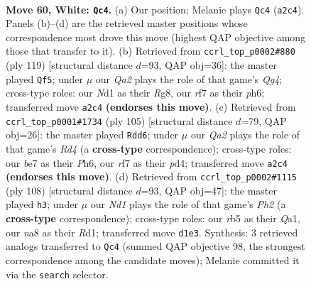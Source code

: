 \documentclass[11pt]{article}
\begin{document}
\clearpage

\begin{figure}[p]\centering
\begin{subfigure}{0.46\textwidth}\centering
\resizebox{\linewidth}{!}{%
\newchessgame
\chessboard[
  setfen={n7/3qbrk1/8/Prp2p1p/3p1Pp1/8/QRRBP2P/3N2K1 w - - 2 60},
  showmover=false,
  pgfstyle=straightmove, color=movearrow, markmove={a2-c4}
]}
\caption{}
\end{subfigure}\hfill
\begin{subfigure}{0.46\textwidth}\centering
\resizebox{\linewidth}{!}{%
\newchessgame
\chessboard[
  setfen={6rk/2p2r2/1p1p3P/3Pn1q1/2P2p2/P1R2B2/KP5Q/5R2 b - - 8 60},
  showmover=false,
  pgfstyle=straightmove, color=movearrow, markmove={g5-f5}
]}
\caption{}
\end{subfigure}
\\[4pt]
\begin{subfigure}{0.46\textwidth}\centering
\resizebox{\linewidth}{!}{%
\newchessgame
\chessboard[
  setfen={6k1/3q2p1/2r1pp1p/3r4/p2P4/PbB1RP1P/1P4P1/2R2Q1K b - - 15 53},
  showmover=false,
  pgfstyle=straightmove, color=movearrow, markmove={d5-d6}
]}
\caption{}
\end{subfigure}\hfill
\begin{subfigure}{0.46\textwidth}\centering
\resizebox{\linewidth}{!}{%
\newchessgame
\chessboard[
  setfen={1r3q1k/7b/p3rn1p/P1pN1p2/5P2/4p3/4B2P/Q2R2RK w - - 2 55},
  showmover=false,
  pgfstyle=straightmove, color=movearrow, markmove={h2-h3}
]}
\caption{}
\end{subfigure}
\caption{\textbf{Move 60, White: \texttt{Qc4}.} (a) Our position; Melanie plays \texttt{Qc4} (\texttt{a2c4}). Panels (b)--(d) are the retrieved master positions whose correspondence most drove this move (highest QAP objective among those that transfer to it). (b) Retrieved from \texttt{ccrl\_top\_p0002\#880} (ply 119) [structural distance $d$=93, QAP obj=36]: the master played \texttt{Qf5}; under $\mu$ our \emph{Qa2} plays the role of that game's \emph{Qg4}; cross-type roles: our \emph{N}d1 as their \emph{R}g8, our \emph{r}f7 as their \emph{p}h6; transferred move \texttt{a2c4} \textbf{(endorses this move)}. (c) Retrieved from \texttt{ccrl\_top\_p0001\#1734} (ply 105) [structural distance $d$=79, QAP obj=26]: the master played \texttt{Rdd6}; under $\mu$ our \emph{Qa2} plays the role of that game's \emph{Rd4} (a \textbf{cross-type} correspondence); cross-type roles: our \emph{b}e7 as their \emph{P}h6, our \emph{r}f7 as their \emph{p}d4; transferred move \texttt{a2c4} \textbf{(endorses this move)}. (d) Retrieved from \texttt{ccrl\_top\_p0002\#1115} (ply 108) [structural distance $d$=93, QAP obj=47]: the master played \texttt{h3}; under $\mu$ our \emph{Nd1} plays the role of that game's \emph{Ph2} (a \textbf{cross-type} correspondence); cross-type roles: our \emph{r}b5 as their \emph{Q}a1, our \emph{n}a8 as their \emph{R}d1; transferred move \texttt{d1e3}. Synthesis: 3 retrieved analogs transferred to \texttt{Qc4} (summed QAP objective 98, the strongest correspondence among the candidate moves); Melanie committed it via the \texttt{search} selector.}
\label{fig:thought-m118}
\end{figure}
\end{document}
